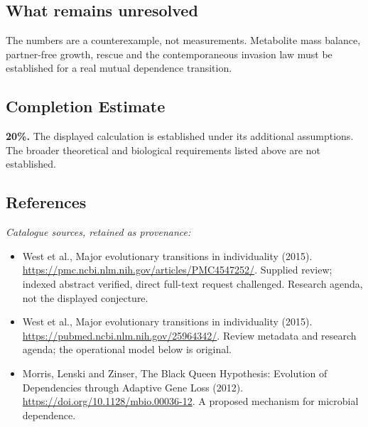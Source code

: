 \documentclass[11pt]{article}
\begin{document}
\subsection{What remains unresolved}
The numbers are a counterexample, not measurements. Metabolite mass balance, partner-free growth, rescue and the contemporaneous invasion law must be established for a real mutual dependence transition.
\subsection{Completion Estimate}
\textbf{20\%.} The displayed calculation is established under its additional assumptions. The broader theoretical and biological requirements listed above are not established.
\subsection{References}
\noindent\emph{Catalogue sources, retained as provenance:}
\begin{itemize}
\item West et al., Major evolutionary transitions in individuality (2015). \url{https://pmc.ncbi.nlm.nih.gov/articles/PMC4547252/}. Supplied review; indexed abstract verified, direct full-text request challenged. Research agenda, not the displayed conjecture.
\item West et al., Major evolutionary transitions in individuality (2015). \url{https://pubmed.ncbi.nlm.nih.gov/25964342/}. Review metadata and research agenda; the operational model below is original.
\item Morris, Lenski and Zinser, The Black Queen Hypothesis: Evolution of Dependencies through Adaptive Gene Loss (2012). \url{https://doi.org/10.1128/mbio.00036-12}. A proposed mechanism for microbial dependence.
\end{itemize}
\end{document}
